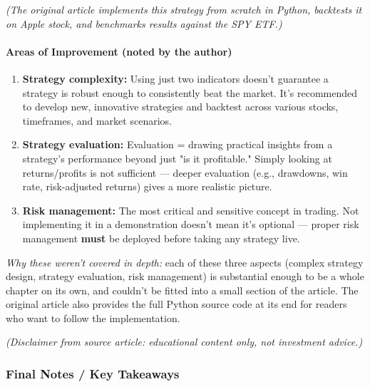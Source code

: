 \documentclass[12pt,openany]{book}
\begin{document}
\emph{(The original article implements this strategy from scratch in Python, backtests it on Apple stock, and benchmarks results against the SPY ETF.)}

\paragraph{Areas of Improvement (noted by the author)}

\begin{enumerate}[leftmargin=*]
    \item \textbf{Strategy complexity:} Using just two indicators doesn't guarantee a strategy is robust enough to consistently beat the market. It's recommended to develop new, innovative strategies and backtest across various stocks, timeframes, and market scenarios.
    \item \textbf{Strategy evaluation:} Evaluation = drawing practical insights from a strategy's performance beyond just "is it profitable." Simply looking at returns/profits is not sufficient --- deeper evaluation (e.g., drawdowns, win rate, risk-adjusted returns) gives a more realistic picture.
    \item \textbf{Risk management:} The most critical and sensitive concept in trading. Not implementing it in a demonstration doesn't mean it's optional --- proper risk management \textbf{must} be deployed before taking any strategy live.
\end{enumerate}

\emph{Why these weren't covered in depth:} each of these three aspects (complex strategy design, strategy evaluation, risk management) is substantial enough to be a whole chapter on its own, and couldn't be fitted into a small section of the article. The original article also provides the full Python source code at its end for readers who want to follow the implementation.

\emph{(Disclaimer from source article: educational content only, not investment advice.)}

\subsubsection{Final Notes / Key Takeaways}
\end{document}

